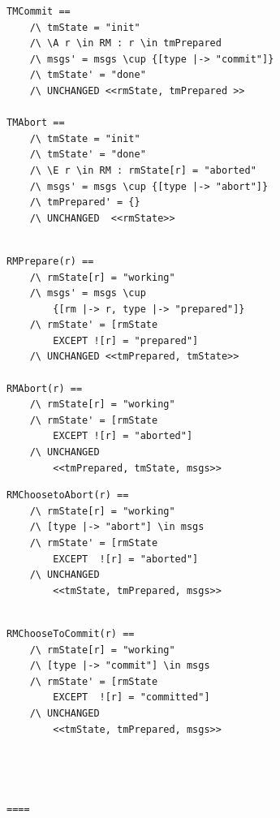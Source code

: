 \documentclass{beamer}
\begin{document}
\begin{frame}[fragile]
    \begin{lstlisting}
TMCommit == 
    /\ tmState = "init"
    /\ \A r \in RM : r \in tmPrepared
    /\ msgs' = msgs \cup {[type |-> "commit"]}
    /\ tmState' = "done"
    /\ UNCHANGED <<rmState, tmPrepared >> 
    
TMAbort ==
    /\ tmState = "init"
    /\ tmState' = "done"
    /\ \E r \in RM : rmState[r] = "aborted"
    /\ msgs' = msgs \cup {[type |-> "abort"]}
    /\ tmPrepared' = {} 
    /\ UNCHANGED  <<rmState>>


    \end{lstlisting}
\end{frame}


\begin{frame}[fragile]
    \begin{lstlisting}
RMPrepare(r) == 
    /\ rmState[r] = "working"
    /\ msgs' = msgs \cup 
        {[rm |-> r, type |-> "prepared"]}
    /\ rmState' = [rmState 
        EXCEPT ![r] = "prepared"]
    /\ UNCHANGED <<tmPrepared, tmState>>

RMAbort(r) == 
    /\ rmState[r] = "working"
    /\ rmState' = [rmState 
        EXCEPT ![r] = "aborted"]
    /\ UNCHANGED 
        <<tmPrepared, tmState, msgs>>

    \end{lstlisting}
\end{frame}

\begin{frame}[fragile]
    \begin{lstlisting}
RMChoosetoAbort(r) == 
    /\ rmState[r] = "working"
    /\ [type |-> "abort"] \in msgs 
    /\ rmState' = [rmState 
        EXCEPT  ![r] = "aborted"]
    /\ UNCHANGED  
        <<tmState, tmPrepared, msgs>>


    \end{lstlisting}

\end{frame}

\begin{frame}[fragile]
    \begin{lstlisting}
RMChooseToCommit(r) == 
    /\ rmState[r] = "working"
    /\ [type |-> "commit"] \in msgs 
    /\ rmState' = [rmState 
        EXCEPT  ![r] = "committed"]
    /\ UNCHANGED  
        <<tmState, tmPrepared, msgs>>




====
    \end{lstlisting}


\end{frame}
\end{document}
